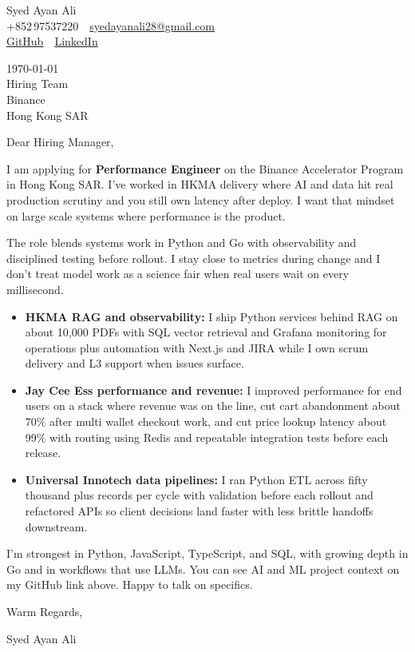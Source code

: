 \documentclass[11pt,a4paper]{article}
\begin{document}
\noindent
Syed Ayan Ali\\
+852\,97537220 \,\textbar\, \href{mailto:syedayanali28@gmail.com}{syedayanali28@gmail.com}\\
\href{https://github.com/syedayanali28}{GitHub} \,\textbar\, \href{https://www.linkedin.com/in/syedayanali/}{LinkedIn}

\vspace{1em}

\noindent
\today\\[0.8em]
Hiring Team\\
Binance\\
Hong Kong SAR

\vspace{1em}

Dear Hiring Manager,

I am applying for \textbf{Performance Engineer} on the Binance Accelerator Program in Hong Kong SAR. I've worked in HKMA delivery where AI and data hit real production scrutiny and you still own latency after deploy. I want that mindset on large scale systems where performance is the product.

The role blends systems work in Python and Go with observability and disciplined testing before rollout. I stay close to metrics during change and I don't treat model work as a science fair when real users wait on every millisecond.

\begin{itemize}
\item \textbf{HKMA RAG and observability:} I ship Python services behind RAG on about 10{,}000 PDFs with SQL vector retrieval and Grafana monitoring for operations plus automation with Next.js and JIRA while I own scrum delivery and L3 support when issues surface.

\item \textbf{Jay Cee Ess performance and revenue:} I improved performance for end users on a stack where revenue was on the line, cut cart abandonment about 70\% after multi wallet checkout work, and cut price lookup latency about 99\% with routing using Redis and repeatable integration tests before each release.

\item \textbf{Universal Innotech data pipelines:} I ran Python ETL across fifty thousand plus records per cycle with validation before each rollout and refactored APIs so client decisions land faster with less brittle handoffs downstream.
\end{itemize}

I'm strongest in Python, JavaScript, TypeScript, and SQL, with growing depth in Go and in workflows that use LLMs. You can see AI and ML project context on my GitHub link above. Happy to talk on specifics.

\vspace{1em}

Warm Regards,

\vspace{0.5em}

Syed Ayan Ali
\end{document}
